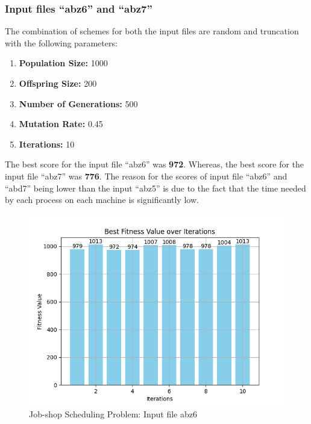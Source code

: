 \documentclass[12pt]{article}
\begin{document}


\newpage

\subsubsection{Input files ``abz6'' and ``abz7''}

The combination of schemes for both the input files are random and truncation with the following parameters:

\begin{enumerate}
    \item \textbf{Population Size:} 1000
    \item \textbf{Offspring Size:} 200
    \item \textbf{Number of Generations:} 500
    \item \textbf{Mutation Rate:} 0.45
    \item \textbf{Iterations:} 10
\end{enumerate}

The best score for the input file ``abz6'' was \textbf{972}. Whereas, the best score for the input file ``abz7'' was \textbf{776}. The reason for the scores of input file ``abz6'' and ``abd7'' being lower than the input ``abz5'' is due to the fact that the time needed by each process on each machine is significantly low. 

\newpage

\begin{figure}[h]
    \centering
    \includegraphics[width=1\textwidth]{images/abz6_rntr1000-200-500-0.45-10.png}
    \caption{Job-shop Scheduling Problem: Input file abz6}
\end{figure}
\end{document}
